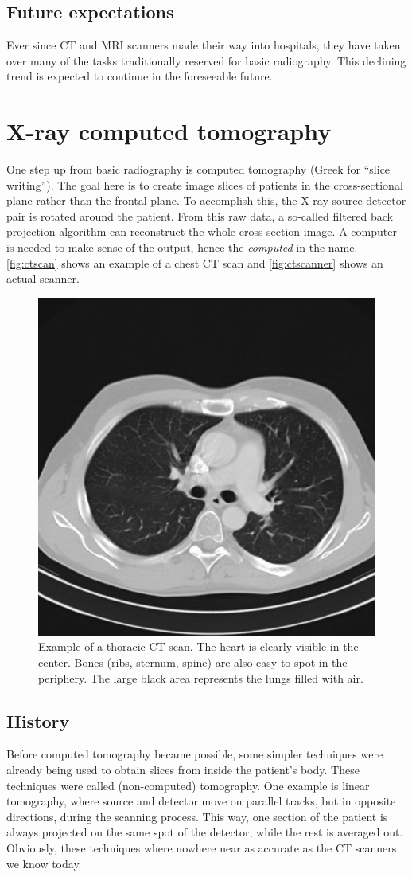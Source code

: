 \subsection{Future expectations}
Ever since CT and MRI scanners made their way into hospitals, they have taken
over many of the tasks traditionally reserved for basic radiography. This
declining trend is expected to continue in the foreseeable future.

\section{X-ray computed tomography}
One step up from basic radiography is computed tomography (Greek for ``slice
writing''). The goal here is to create image slices of patients in the
cross-sectional plane rather than the frontal plane. To accomplish this, the X-ray
source-detector pair is rotated around the patient. From this raw data, a
so-called filtered back projection algorithm can reconstruct the whole cross
section image. A computer is needed to make sense of the output, hence the
\emph{computed} in the name. \autoref{fig:ctscan} shows an example of a chest
CT scan and \autoref{fig:ctscanner} shows an actual scanner.

\begin{figure}[ht]
\begin{center}
  \includegraphics[width=0.4\linewidth]{img/ct-thorax.jpg}
  \caption{Example of a thoracic CT scan. The heart is clearly visible in the
  center. Bones (ribs, sternum, spine) are also easy to spot in the periphery.
  The large black area represents the lungs filled with air.}
  \label{fig:ctscan}
\end{center}
\end{figure}

\subsection{History}
Before computed tomography became possible, some simpler techniques were already
being used to obtain slices from inside the patient's body. These techniques
were called (non-computed) tomography. One example is linear tomography,
where source and detector move on parallel tracks, but in opposite directions,
during the scanning process. This way, one section of the patient is always
projected on the same spot of the detector, while the rest is averaged out.
Obviously, these techniques where nowhere near as accurate as the CT scanners we
know today.

